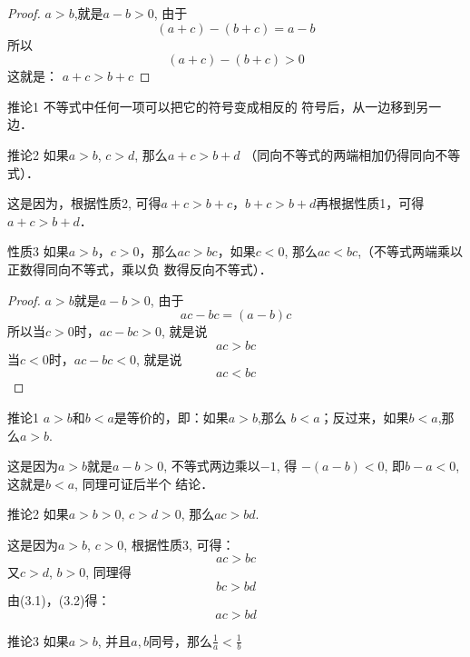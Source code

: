 \begin{proof}
    $a>b$,就是$a-b>0$,
    由于
    $$(a+c)-(b+c)=a-b$$
    所以
    $$(a+c)-(b+c)>0$$
    这就是：
$a+c>b+c$
\end{proof}

\begin{blk}{推论1}
不等式中任何一项可以把它的符号变成相反的
符号后，从一边移到另一边．

\end{blk}

\begin{blk}{推论2}
    如果$a>b$, $c>d$, 那么$a+c>b+d$ （同向不等式的两端相加仍得同向不等式）．
    \end{blk}

这是因为，根据性质2, 可得$a+c>b+c$，$b+c>b+
d$再根据性质1，可得$a+c>b+d$．

\begin{blk}{性质3}
如果$a>b$，$c>0$，那么$ac>bc$，如果$c<0$,
那么$ac<bc$,（不等式两端乘以正数得同向不等式，乘以负
数得反向不等式）．
\end{blk}

\begin{proof}
$a>b$就是$a-b>0$,
由于
$$ac-bc=(a-b)c$$
所以当$c>0$时，$ac-bc>0$, 就是说
$$ac>bc$$
当$c<0$时，$ac-bc<0$, 就是说
$$ac<bc$$
\end{proof}

\begin{blk}{推论1}
   $a>b$和$b<a$是等价的，即：如果$a>b$,那么
$b<a$；反过来，如果$b<a$,那么$a>b$.
\end{blk}

这是因为$a>b$就是$a-b>0$, 不等式两边乘以$-1$, 得
$-(a-b)<0$, 即$b-a<0$, 这就是$b<a$, 同理可证后半个
结论．

\begin{blk}{推论2}
    如果$a>b>0$, $c>d>0$, 那么$ac>bd$.
\end{blk}

 
这是因为$a>b$, $c>0$, 根据性质3, 可得：
\begin{equation}
    ac>bc
\end{equation}
又$c>d$, $b>0$, 同理得
\begin{equation}
    bc>bd
\end{equation}
由(3.1)，(3.2)得：
\begin{equation*}
    ac>bd  \tag{性质1}
\end{equation*}

\begin{blk}{推论3}
    如果$a>b$, 并且$a,b$同号，那么$\frac{1}{a}<\frac{1}{b}$
\end{blk}

